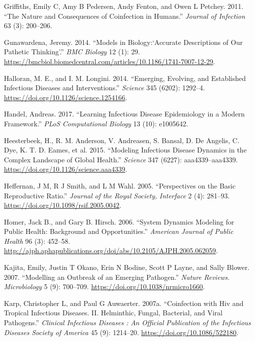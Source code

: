 \documentclass[
]{book}
\begin{document}
\leavevmode\hypertarget{ref-griffiths11}{}%
Griffiths, Emily C, Amy B Pedersen, Andy Fenton, and Owen L Petchey. 2011. ``The Nature and Consequences of Coinfection in Humans.'' \emph{Journal of Infection} 63 (3): 200--206.

\leavevmode\hypertarget{ref-gunawardena14}{}%
Gunawardena, Jeremy. 2014. ``Models in Biology:`Accurate Descriptions of Our Pathetic Thinking'.'' \emph{BMC Biology} 12 (1): 29. \url{https://bmcbiol.biomedcentral.com/articles/10.1186/1741-7007-12-29}.

\leavevmode\hypertarget{ref-halloran14}{}%
Halloran, M. E., and I. M. Longini. 2014. ``Emerging, Evolving, and Established Infectious Diseases and Interventions.'' \emph{Science} 345 (6202): 1292--4. \url{https://doi.org/10.1126/science.1254166}.

\leavevmode\hypertarget{ref-handel17}{}%
Handel, Andreas. 2017. ``Learning Infectious Disease Epidemiology in a Modern Framework.'' \emph{PLoS Computational Biology} 13 (10): e1005642.

\leavevmode\hypertarget{ref-heesterbeek15}{}%
Heesterbeek, H., R. M. Anderson, V. Andreasen, S. Bansal, D. De Angelis, C. Dye, K. T. D. Eames, et al. 2015. ``Modeling Infectious Disease Dynamics in the Complex Landscape of Global Health.'' \emph{Science} 347 (6227): aaa4339--aaa4339. \url{https://doi.org/10.1126/science.aaa4339}.

\leavevmode\hypertarget{ref-heffernan05}{}%
Heffernan, J M, R J Smith, and L M Wahl. 2005. ``Perspectives on the Basic Reproductive Ratio.'' \emph{Journal of the Royal Society, Interface} 2 (4): 281--93. \url{https://doi.org/10.1098/rsif.2005.0042}.

\leavevmode\hypertarget{ref-homer06}{}%
Homer, Jack B., and Gary B. Hirsch. 2006. ``System Dynamics Modeling for Public Health: Background and Opportunities.'' \emph{American Journal of Public Health} 96 (3): 452--58. \url{http://ajph.aphapublications.org/doi/abs/10.2105/AJPH.2005.062059}.

\leavevmode\hypertarget{ref-kajita07}{}%
Kajita, Emily, Justin T Okano, Erin N Bodine, Scott P Layne, and Sally Blower. 2007. ``Modelling an Outbreak of an Emerging Pathogen.'' \emph{Nature Reviews. Microbiology} 5 (9): 700--709. \url{https://doi.org/10.1038/nrmicro1660}.

\leavevmode\hypertarget{ref-karp07}{}%
Karp, Christopher L, and Paul G Auwaerter. 2007a. ``Coinfection with Hiv and Tropical Infectious Diseases. II. Helminthic, Fungal, Bacterial, and Viral Pathogens.'' \emph{Clinical Infectious Diseases : An Official Publication of the Infectious Diseases Society of America} 45 (9): 1214--20. \url{https://doi.org/10.1086/522180}.
\end{document}
